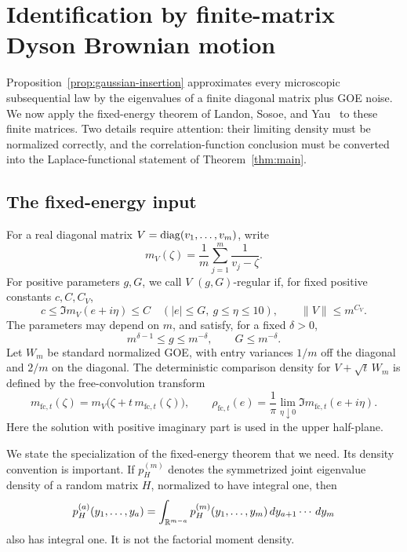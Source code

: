 \section{Identification by finite-matrix Dyson Brownian motion}
\label{sec:dbm}

Proposition~\ref{prop:gaussian-insertion} approximates every microscopic
subsequential law by the eigenvalues of a finite diagonal matrix plus GOE
noise. We now apply the fixed-energy theorem of Landon, Sosoe, and
Yau~\cite{LSY2019} to these finite matrices.
Two details require attention: their limiting density must be normalized
correctly, and the correlation-function conclusion must be converted into
the Laplace-functional statement of Theorem~\ref{thm:main}.

\subsection{The fixed-energy input}

For a real diagonal matrix \(V=\operatorname{diag}(v_1,\ldots,v_m)\), write
\[
 m_V(\zeta)=\frac1m\sum_{j=1}^m\frac1{v_j-\zeta}.
\]
For positive parameters \(g,G\), we call \(V\) \((g,G)\)-regular
if, for fixed positive constants
\(c,C,C_V\),
\begin{equation}
 \label{eq:dbm-regularity}
 c\le \Im m_V(e+i\eta)\le C
 \quad (|e|\le G,\ g\le\eta\le10),
 \qquad \|V\|\le m^{C_V}.
\end{equation}
The parameters may depend on \(m\), and satisfy, for a fixed
\(\delta>0\),
\begin{equation}
 \label{eq:dbm-parameter-domain}
 m^{\delta-1}\le g\le m^{-\delta},
 \qquad G\le m^{-\delta}.
\end{equation}
Let \(W_m\) be standard normalized GOE, with entry variances \(1/m\)
off the diagonal and \(2/m\) on the diagonal. The deterministic comparison
density for \(V+\sqrt t\,W_m\) is defined by the free-convolution transform
\begin{equation}
 \label{eq:dbm-free-convolution}
 m_{\mathrm{fc},t}(\zeta)
   =m_V\bigl(\zeta+t\,m_{\mathrm{fc},t}(\zeta)\bigr),
 \qquad
 \rho_{\mathrm{fc},t}(e)
   =\frac1\pi\lim_{\eta\downarrow0}
          \Im m_{\mathrm{fc},t}(e+i\eta).
\end{equation}
Here the solution with positive imaginary part is used in the upper
half-plane.

We state the specialization of the fixed-energy theorem that we need.
Its density convention is important. If \(p_H^{(m)}\) denotes the
symmetrized joint eigenvalue density of a random matrix \(H\), normalized
to have integral one, then
\[
 p_H^{(a)}(y_1,\ldots,y_a)
   =\int_{\mathbb R^{m-a}}p_H^{(m)}(y_1,\ldots,y_m)
        \,d y_{a+1}\cdots\,d y_m
\]
also has integral one. It is not the factorial moment density.


